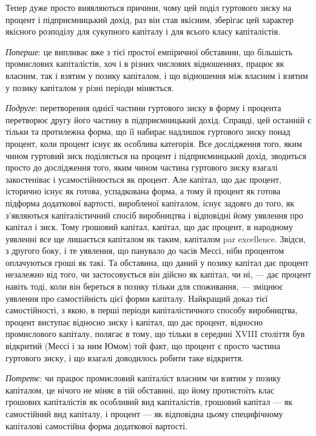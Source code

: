 
Тепер дуже просто виявляються причини, чому цей поділ
гуртового зиску на процент і підприємницький дохід, раз він
став якісним, зберігає цей характер якісного розподілу для сукупного
капіталу і для всього класу капіталістів.

\emph{Поперше}: це випливає вже з тієї простої емпіричної обставини,
що більшість промислових капіталістів, хоч і в різних числових
відношеннях, працює як власним, так і взятим у позику
капіталом, і що відношення між власним і взятим у позику капіталом
у різні періоди міняється.

\emph{Подруге}: перетворення однієї частини гуртового зиску в форму і
процента перетворює другу його частину в підприємницький
дохід. Справді, цей останній є тільки та протилежна форма, що
її набирає надлишок гуртового зиску понад процент, коли процент
існує як особлива категорія. Все дослідження того, яким
чином гуртовий зиск поділяється на процент і підприємницький
дохід, зводиться просто до дослідження того, яким чином частина
гуртового зиску взагалі закостеніває і усамостійнюється
як процент. Але капітал, що дає процент, історично існує як
готова, успадкована форма, а тому й процент як готова підформа
додаткової вартості, виробленої капіталом, існує задовго
до того, як з’являються капіталістичний спосіб виробництва і
відповідні йому уявлення про капітал і зиск. Тому грошовий капітал,
капітал, що дає процент, в народному уявленні все ще лишається
капіталом як таким, капіталом par excellence. Звідси, з
другого боку, і те уявлення, що панувало до часів Мессі, ніби процентом
оплачуються гроші як такі. Та обставина, що даний у
позику капітал дає процент незалежно від того, чи застосовується
він дійсно як капітал, чи ні, — дає процент навіть тоді, коли він береться
в позику тільки для споживання, — зміцнює уявлення про
самостійність цієї форми капіталу. Найкращий доказ тієї самостійності,
з якою, в перші періоди капіталістичного способу
виробництва, процент виступає відносно зиску і капітал, що дає
процент, відносно промислового капіталу, полягає в тому, що
тільки в середині XVIII століття був відкритий (Мессі і за ним
Юмом) той факт, що процент є просто частина гуртового зиску,
і що взагалі доводилось робити таке відкриття.

\emph{Потретє}: чи працює промисловий капіталіст власним чи
взятим у позику капіталом, це нічого не міняє в тій обставині,
що йому протистоїть клас грошових капіталістів як особливий
вид капіталістів, грошовий капітал — як самостійний вид капіталу,
і процент — як відповідна цьому специфічному капіталові самостійна
форма додаткової вартості.

